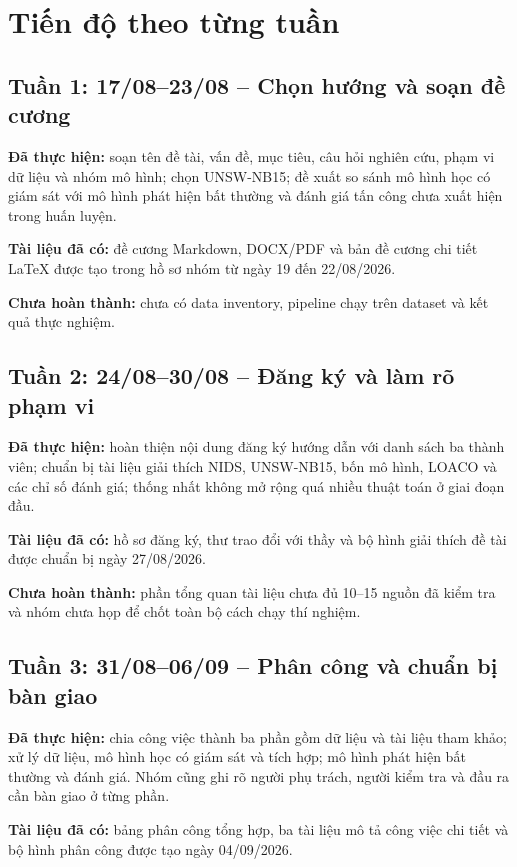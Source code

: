 \documentclass[12pt,a4paper,oneside]{article}
\begin{document}
\section{Tiến độ theo từng tuần}

\subsection{Tuần 1: 17/08--23/08 -- Chọn hướng và soạn đề cương}
\textbf{Đã thực hiện:} soạn tên đề tài, vấn đề, mục tiêu, câu hỏi nghiên cứu, phạm vi dữ liệu và nhóm mô hình; chọn UNSW-NB15; đề xuất so sánh mô hình học có giám sát với mô hình phát hiện bất thường và đánh giá tấn công chưa xuất hiện trong huấn luyện.

\textbf{Tài liệu đã có:} đề cương Markdown, DOCX/PDF và bản đề cương chi tiết LaTeX được tạo trong hồ sơ nhóm từ ngày 19 đến 22/08/2026.

\textbf{Chưa hoàn thành:} chưa có data inventory, pipeline chạy trên dataset và kết quả thực nghiệm.

\subsection{Tuần 2: 24/08--30/08 -- Đăng ký và làm rõ phạm vi}
\textbf{Đã thực hiện:} hoàn thiện nội dung đăng ký hướng dẫn với danh sách ba thành viên; chuẩn bị tài liệu giải thích NIDS, UNSW-NB15, bốn mô hình, LOACO và các chỉ số đánh giá; thống nhất không mở rộng quá nhiều thuật toán ở giai đoạn đầu.

\textbf{Tài liệu đã có:} hồ sơ đăng ký, thư trao đổi với thầy và bộ hình giải thích đề tài được chuẩn bị ngày 27/08/2026.

\textbf{Chưa hoàn thành:} phần tổng quan tài liệu chưa đủ 10--15 nguồn đã kiểm tra và nhóm chưa họp để chốt toàn bộ cách chạy thí nghiệm.

\subsection{Tuần 3: 31/08--06/09 -- Phân công và chuẩn bị bàn giao}
\textbf{Đã thực hiện:} chia công việc thành ba phần gồm dữ liệu và tài liệu tham khảo; xử lý dữ liệu, mô hình học có giám sát và tích hợp; mô hình phát hiện bất thường và đánh giá. Nhóm cũng ghi rõ người phụ trách, người kiểm tra và đầu ra cần bàn giao ở từng phần.

\textbf{Tài liệu đã có:} bảng phân công tổng hợp, ba tài liệu mô tả công việc chi tiết và bộ hình phân công được tạo ngày 04/09/2026.
\end{document}
